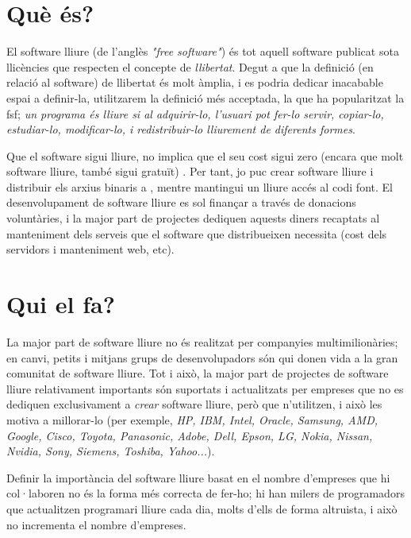 
\section{Què és?}

El software lliure (de l'anglès \emph{"free software"}) és tot aquell software publicat
sota llicències que respecten el concepte de \emph{llibertat}. Degut a que la definició
(en relació al software) de llibertat és molt àmplia, i es podria dedicar inacabable espai
a definir-la, utilitzarem la definició més acceptada, la que ha popularitzat la \ac{fsf}; \emph{un programa és lliure si al adquirir-lo, l'usuari pot fer-lo servir,
copiar-lo, estudiar-lo, modificar-lo, i redistribuir-lo lliurement de diferents formes}. \cite{wikifree}

Que el software sigui lliure, no implica que el seu cost sigui zero (encara que molt
software lliure, també sigui gratuït) \cite{sellingfree}. Per tant, jo puc crear software lliure i distribuir els arxius
binaris a , mentre mantingui un lliure accés al codi font. El desenvolupament de software
lliure es sol finançar a través de donacions voluntàries, i la major part de projectes dediquen
aquests diners recaptats al manteniment dels serveis que el software que distribueixen necessita
(cost dels servidors i manteniment web, etc).

\section{Qui el fa?}

La major part de software lliure no és realitzat per companyies multimilionàries; en canvi,
petits i mitjans grups de desenvolupadors són qui donen vida a la gran comunitat de software lliure.
Tot i això, la major part de projectes de software lliure relativament importants
són suportats i actualitzats per empreses que no es dediquen exclusivament a \emph{crear}
software lliure, però que n'utilitzen, i això les motiva a millorar-lo (per exemple, \emph{HP, IBM, Intel, Oracle, Samsung, AMD, Google, Cisco, Toyota, Panasonic, Adobe, Dell, Epson, LG, Nokia, Nissan, Nvidia, Sony, Siemens, Toshiba, Yahoo...}\cite{linuxmembers}).

Definir la importància del software lliure basat en el nombre d'empreses que hi col·laboren no és la forma més correcta de fer-ho; hi han milers de programadors que actualitzen programari lliure cada dia, molts d'ells de forma altruista, i això no incrementa el nombre d'empreses.

